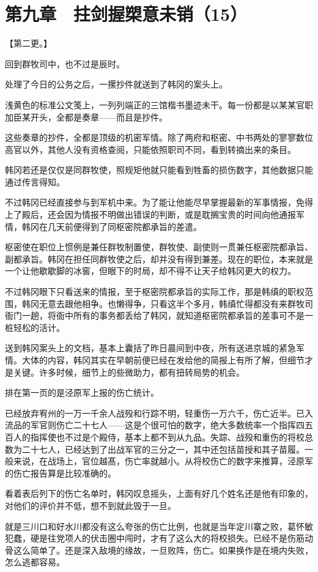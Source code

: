 \section{第九章　拄剑握槊意未销（15）}

【第二更。】

回到群牧司中，也不过是辰时。

处理了今日的公务之后，一摞抄件就送到了韩冈的案头上。

浅黄色的标准公文笺上，一列列端正的三馆楷书墨迹未干。每一份都是以某某官职加臣某开头，全都是奏章——而且是抄件。

这些奏章的抄件，全都是顶级的机密军情。除了两府和枢密、中书两处的寥寥数位高官以外，其他人没有资格查阅，只能依照职司不同，看到转摘出来的条目。

韩冈若还是仅仅是同群牧使，照规矩他就只能看到牲畜的损伤数字，其他数据只能通过传言得知。

不过韩冈已经直接参与到军机中来。为了能让他能尽早掌握最新的军事情报，免得上了殿后，还会因为情报不明做出错误的判断，或是耽搁宝贵的时间向他通报军情，韩冈在几天前便得到了同枢密院都承旨的差遣。

枢密使在职位上惯例是兼任群牧制置使，群牧使、副使则一贯兼任枢密院都承旨、副都承旨。韩冈在担任同群牧使之后，却并没有得到兼差。现在的职位，本来就是一个让他歇歇脚的冰窖，但眼下的时局，却不得不让天子给韩冈更大的权力。

不过韩冈眼下只看送来的情报，至于枢密院都承旨的实际工作，那是韩缜的职权范围，韩冈无意去跟他相争。也懒得争，只看这半个多月，韩缜忙得都没有来群牧司衙门一趟，将衙中所有的事务都丢给了韩冈，就知道枢密院都承旨的差事可不是一桩轻松的活计。

送到韩冈案头上的文档，基本上囊括了昨日晨间到中夜，所有送进京城的紧急军情。大体的内容，韩冈其实在早朝前便已经在发给他的简报上有所了解，但细节才是关键。许多时候，细节上的些微助力，都有扭转局势的机会。

排在第一页的是泾原军上报的伤亡统计。

已经放弃宥州的一万一千余人战殁和行踪不明，轻重伤一万六千，伤亡近半。已入流品的军官则伤亡二十七人——这是个很可怕的数字，绝大多数统率一个指挥四五百人的指挥使也不过是个殿侍，基本上都不到从九品。失踪、战殁和重伤的将校总数为二十七人，已经达到了出战军官的三分之一，其中还包括苗授和其子苗履。一般来说，在战场上，官位越髙，伤亡率就越小。从将校伤亡的数字来推算，泾原军的伤亡报告算是比较准确的。

看着表后列下的伤亡名单时，韩冈叹息摇头，上面有好几个姓名还是他有印象的，对他们的评价并不低，想不到就此毁于一旦。

就是三川口和好水川都没有这么夸张的伤亡比例，也就是当年定川寨之败，葛怀敏犯蠢，硬是往党项人的伏击圈中闯时，才有了这么大的将校损失。已经不是伤筋动骨这么简单了。还是深入敌境的缘故，一旦败阵，伤亡。如果换作是在境内失败，怎么逃都容易。

